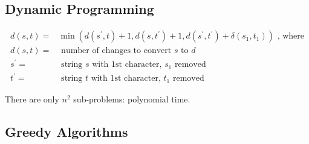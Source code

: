 \documentclass[]{article}
\begin{document}
\subsection{Dynamic Programming}

\begin{align*}
	d(s,t)=& \min(d(s^\prime,t)+1, d(s,t^\prime)+1,d(s^\prime,t^\prime) + \delta(s_1,t_1)) \text{ , where}\\
	d(s,t)=& \text{ number of changes to convert $s$ to $d$}\\
	s^\prime=& \text{ string $s$ with 1st character, $s_1$ removed}\\
	t^\prime=& \text{ string $t$ with 1st character, $t_1$ removed}
\end{align*}

There are only $n^2$ sub-problems: polynomial time.

\subsection{Greedy Algorithms}
\end{document}
